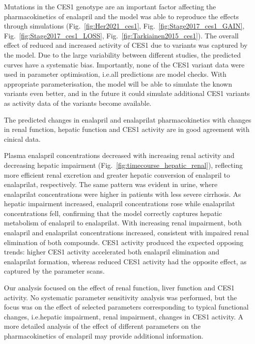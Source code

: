 \documentclass[pharmaceutics,article,submit,pdftex,moreauthors]{Definitions/mdpi}
\begin{document}
Mutations in the CES1 genotype are an important factor affecting the pharmacokinetics of enalapril and the model was able to reproduce the effects through simulations (Fig.~\ref{fig:Her2021_ces1}, Fig.~\ref{fig:Stage2017_ces1_GAIN}, Fig.~\ref{fig:Stage2017_ces1_LOSS}, Fig.~\ref{fig:Tarkiainen2015_ces1}). The overall effect of reduced and increased activity of CES1 due to variants was captured by the model. Due to the large variability between different studies, the predicted curves have a systematic bias. Importantly, none of the CES1 variant data were used in parameter optimisation, i.e.\@ all predictions are model checks. With appropriate parameterisation, the model will be able to simulate the known variants even better, and in the future it could simulate additional CES1 variants as activity data of the variants become available. 

The predicted changes in enalapril and enalaprilat pharmacokinetics with changes in renal function, hepatic function and CES1 activity are in good agreement with cinical data.

Plasma enalapril concentrations decreased with increasing renal activity and decreasing hepatic impairment (Fig.~\ref{fig:timecourse_hepatic_renal}), reflecting more efficient renal excretion and greater hepatic conversion of enalapril to enalaprilat, respectively. The same pattern was evident in urine, where enalaprilat concentrations were higher in patients with less severe cirrhosis. As hepatic impairment increased, enalapril concentrations rose while enalaprilat concentrations fell, confirming that the model correctly captures hepatic metabolism of enalapril to enalaprilat. With increasing renal impairment, both enalapril and enalaprilat concentrations increased, consistent with impaired renal elimination of both compounds. CES1 activity produced the expected opposing trends: higher CES1 activity accelerated both enalapril elimination and enalaprilat formation, whereas reduced CES1 activity had the opposite effect, as captured by the parameter scans.

Our analysis focused on the effect of renal function, liver function and CES1 activity. No systematic parameter sensitivity analysis was performed, but the focus was on the effect of selected parameters corresponding to typical functional changes, i.e.\@ hepatic impairment, renal impairment, changes in CES1 activity. A more detailed analysis of the effect of different parameters on the pharmacokinetics of enalapril may provide additional information.
\end{document}
